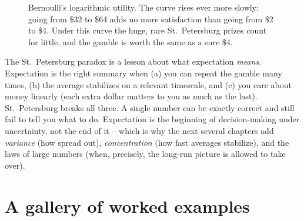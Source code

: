 \begin{figure}[H]
\centering
{}
\caption{Bernoulli's logarithmic utility. The curve rises ever more slowly: going
from \$32 to \$64 adds no more satisfaction than going from \$2 to \$4. Under
this curve the huge, rare St.\ Petersburg prizes count for little, and the
gamble is worth the same as a sure \$4.}
\label{ch08:fig-log-utility}
\end{figure}

\begin{aestheticbox}
The St.\ Petersburg paradox is a lesson about
what expectation \emph{means}. Expectation is the right summary when (a) you can
repeat the gamble many times, (b) the average stabilizes on a relevant
timescale, and (c) you care about money linearly (each extra dollar matters to
you as much as the last). St.\ Petersburg breaks all three. A single number can
be exactly correct and still fail to tell you what to do. Expectation is the beginning of
decision-making under uncertainty, not the end of it -- which is why the next
several chapters add \emph{variance} (how spread out), \emph{concentration} (how
fast averages stabilize), and the laws of large numbers (when, precisely, the
long-run picture is allowed to take over).
\end{aestheticbox}

\section{A gallery of worked examples}
\label{ch08:gallery}

